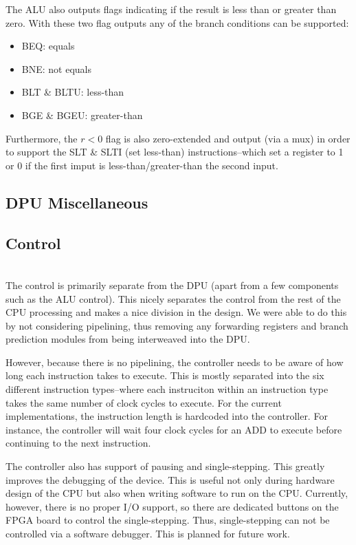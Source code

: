 \documentclass[lettersize,journal]{IEEEtran}
\begin{document}
\begin{itemize}
The ALU also outputs flags indicating if the result is less than or greater than zero.
With these two flag outputs any of the branch conditions can be supported:
\begin{itemize}
    \item BEQ: equals
    \item BNE: not equals
    \item BLT \& BLTU: less-than
    \item BGE \& BGEU: greater-than
\end{itemize}
Furthermore, the $r<0$ flag is also zero-extended and output (via a mux) in order to support the SLT \& SLTI (set less-than) instructions--which set a register to 1
or 0 if the first imput is less-than/greater-than the second input.

\subsection{DPU Miscellaneous}
\color{red}{TBD}\color{black}

\subsection{Control}
\color{red}{Incomplete...}\color{black}\\
The control is primarily separate from the DPU (apart from a few components such as the ALU control).
This nicely separates the control from the rest of the CPU processing and makes a nice division in the design.
We were able to do this by not considering pipelining, thus removing any forwarding registers and branch prediction modules from being interweaved into the DPU.

However, because there is no pipelining, the controller needs to be aware of how long each instruction takes to execute.
This is mostly separated into the six different instruction types--where each instruciton within an instruction type takes the same number of clock cycles to execute.
For the current implementations, the instruction length is hardcoded into the controller. For instance, the controller will wait four clock cycles for an ADD to execute
before continuing to the next instruction.

The controller also has support of pausing and single-stepping.
This greatly improves the debugging of the device.
This is useful not only during hardware design of the CPU but also when writing software to run on the CPU.
Currently, however, there is no proper I/O support, so there are dedicated buttons on the FPGA board to control the single-stepping.
Thus, single-stepping can not be controlled via a software debugger.
This is planned for future work.


\end{itemize}
\end{document}
